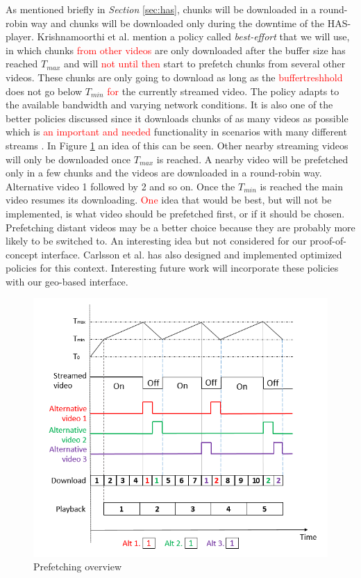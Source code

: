 As mentioned briefly in \textit{Section} \ref{sec:has}, chunks will be downloaded in a round-robin way and chunks will be downloaded only during the downtime of the HAS-player. Krishnamoorthi et al. \cite{bandawarePrefetch} mention a policy called \textit{best-effort} that we will use, in which chunks \textcolor{red}{from other videos} are only downloaded after the buffer size has reached $T_{max}$ and will \textcolor{red}{not until then} start to prefetch chunks from several other videos. These chunks are only going to download as long as the \textcolor{red}{buffertreshhold} does not go below $T_{min}$ \textcolor{red}{for} the currently streamed video. The policy adapts to the available bandwidth and varying network conditions. It is also one of the better policies discussed since it downloads chunks of as many videos as possible which is \textcolor{red}{an important and needed} functionality in scenarios with many different streams \cite{bandawarePrefetch}. In Figure \ref{fig:prefetch} an idea of this can be seen. Other nearby streaming videos will only be downloaded once $T_{max}$ is reached. A nearby video will be prefetched only in a few chunks and the videos are downloaded in a round-robin way. Alternative video 1 followed by 2 and so on. Once the $T_{min}$ is reached the main video resumes its downloading. \textcolor{red}{One} idea that would be best, but will not be implemented, is what video should be prefetched first, or if it should be chosen. Prefetching distant videos may be a better choice because they are probably more likely to be switched to. An interesting idea but not considered for our proof-of-concept interface. Carlsson et al. \cite{optimizedstreaming} has also designed and implemented optimized policies for this context. Interesting future work will incorporate these policies with our geo-based interface.

\begin{figure}[ht!]
\begin{center}
	\includegraphics[scale=0.6]{prefetch.png}
	\caption{Prefetching overview}
	\label{fig:prefetch}
\end{center}
\end{figure}

